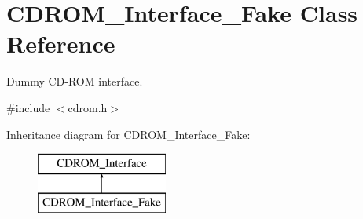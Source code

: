 \hypertarget{classCDROM__Interface__Fake}{\section{C\-D\-R\-O\-M\-\_\-\-Interface\-\_\-\-Fake Class Reference}
\label{classCDROM__Interface__Fake}
}


Dummy C\-D-\/\-R\-O\-M interface.  




{\ttfamily \#include $<$cdrom.\-h$>$}

Inheritance diagram for C\-D\-R\-O\-M\-\_\-\-Interface\-\_\-\-Fake\-:\begin{figure}[H]
\begin{center}
\leavevmode
\includegraphics[height=2.000000cm]{classCDROM__Interface__Fake}
\end{center}
\end{figure}
